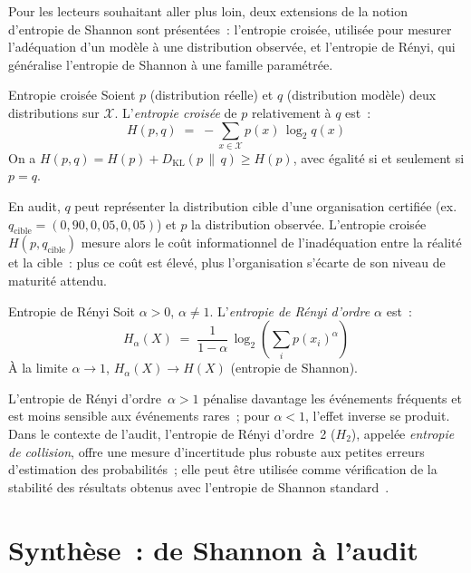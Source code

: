 Pour les lecteurs souhaitant aller plus loin, deux extensions de la notion
d'entropie de Shannon sont présentées~: l'entropie croisée, utilisée pour mesurer
l'adéquation d'un modèle à une distribution observée, et l'entropie de Rényi,
qui généralise l'entropie de Shannon à une famille paramétrée.

\begin{boxdef}{Entropie croisée}
Soient $p$ (distribution réelle) et $q$ (distribution modèle) deux distributions
sur $\mathcal{X}$. L'\emph{entropie croisée} de $p$ relativement à $q$ est~:
\begin{equation}
  H(p, q) \;=\; -\sum_{x \in \mathcal{X}} p(x)\,\log_2 q(x)
  \label{eq:entropie-croisee}
\end{equation}
On a $H(p,q) = H(p) + D_{\mathrm{KL}}(p\,\|\,q) \geq H(p)$, avec égalité si
et seulement si $p = q$.
\end{boxdef}

En audit, $q$ peut représenter la distribution cible d'une organisation certifiée
(ex.~$q_{\mathrm{cible}} = (0{,}90, 0{,}05, 0{,}05)$) et $p$ la distribution observée.
L'entropie croisée $H(p, q_{\mathrm{cible}})$ mesure alors le coût informationnel
de l'inadéquation entre la réalité et la cible~: plus ce coût est élevé, plus
l'organisation s'écarte de son niveau de maturité attendu.

\begin{boxdef}{Entropie de Rényi}
Soit $\alpha > 0$, $\alpha \neq 1$. L'\emph{entropie de Rényi d'ordre $\alpha$}
est~:
\begin{equation}
  H_\alpha(X) \;=\; \frac{1}{1-\alpha}\,\log_2\!\left(\sum_{i} p(x_i)^\alpha\right)
  \label{eq:renyi}
\end{equation}
À la limite $\alpha \to 1$, $H_\alpha(X) \to H(X)$ (entropie de Shannon).
\end{boxdef}

L'entropie de Rényi d'ordre~$\alpha > 1$ pénalise davantage les événements
fréquents et est moins sensible aux événements rares~; pour $\alpha < 1$,
l'effet inverse se produit. Dans le contexte de l'audit, l'entropie de Rényi
d'ordre~2 ($H_2$), appelée \emph{entropie de collision}, offre une mesure
d'incertitude plus robuste aux petites erreurs d'estimation des probabilités~;
elle peut être utilisée comme vérification de la stabilité des résultats obtenus
avec l'entropie de Shannon standard~\cite{Renyi1961}.

\section{Synthèse~: de Shannon à l'audit}
\label{sec:synthese}

